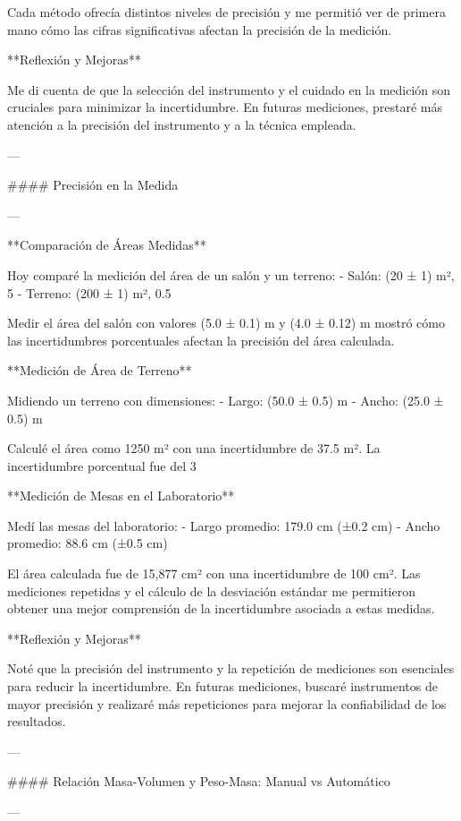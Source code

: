 \documentclass[journal]{IEEEtran}
\begin{document}
Cada método ofrecía distintos niveles de precisión y me permitió ver de primera mano cómo las cifras significativas afectan la precisión de la medición.

**Reflexión y Mejoras**

Me di cuenta de que la selección del instrumento y el cuidado en la medición son cruciales para minimizar la incertidumbre. En futuras mediciones, prestaré más atención a la precisión del instrumento y a la técnica empleada.

---

#### Precisión en la Medida

---

**Comparación de Áreas Medidas**

Hoy comparé la medición del área de un salón y un terreno:
- Salón: (20 ± 1) m², 5%
- Terreno: (200 ± 1) m², 0.5%

Medir el área del salón con valores (5.0 ± 0.1) m y (4.0 ± 0.12) m mostró cómo las incertidumbres porcentuales afectan la precisión del área calculada.

**Medición de Área de Terreno**

Midiendo un terreno con dimensiones:
- Largo: (50.0 ± 0.5) m
- Ancho: (25.0 ± 0.5) m

Calculé el área como 1250 m² con una incertidumbre de 37.5 m². La incertidumbre porcentual fue del 3%

**Medición de Mesas en el Laboratorio**

Medí las mesas del laboratorio:
- Largo promedio: 179.0 cm (±0.2 cm)
- Ancho promedio: 88.6 cm (±0.5 cm)

El área calculada fue de 15,877 cm² con una incertidumbre de 100 cm². Las mediciones repetidas y el cálculo de la desviación estándar me permitieron obtener una mejor comprensión de la incertidumbre asociada a estas medidas.

**Reflexión y Mejoras**

Noté que la precisión del instrumento y la repetición de mediciones son esenciales para reducir la incertidumbre. En futuras mediciones, buscaré instrumentos de mayor precisión y realizaré más repeticiones para mejorar la confiabilidad de los resultados.

---

#### Relación Masa-Volumen y Peso-Masa: Manual vs Automático

---
\end{document}
